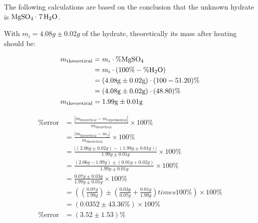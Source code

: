 \documentclass{article}
\begin{document}
The following calculations are based on the conclusion that the unknown hydrate is $\ce{MgSO4* 7H2O}$.

With $m_i = 4.08\si{g} \pm 0.02\si{g}$ of the hydrate, theoretically its mass after heating should be:

\begin{align*}
    m_{\text{theoretical}} & = m_i \cdot \%\ce{MgSO4}                            \\
                           & = m_i \cdot (100\% - \%\ce{H2O})                    \\
                           & = (4.08\si{g} \pm 0.02\si{g}) \cdot (100 - 51.20)\% \\
                           & = (4.08\si{g} \pm 0.02\si{g}) \cdot (48.80)\%       \\
    m_{\text{theoretical}} & = 1.99\si{g} \pm 0.01\si{g}
\end{align*}

\begin{align*}
    \%\text{error} & = \frac{|m_{\text{theoretical}} - m_{\text{experimental}}|}{m_{\text{theoretical}}} \times 100\%                                                                       \\[8pt]
                   & = \frac{|m_{\text{theoretical}} - m_f|}{m_{\text{theoretical}}} \times 100\%                                                                                           \\[8pt]
                   & = \frac{\left| (2.06\si{g} \pm 0.02\si{g}) - (1.99\si{g} \pm 0.01\si{g}) \right|}{1.99\si{g} \pm 0.01\si{g}} \times 100\%                                              \\[8pt]
                   & = \frac{(2.06\si{g} - 1.99\si{g}) \pm (0.01\si{g} + 0.02\si{g})}{1.99\si{g} \pm 0.01\si{g}} \times 100\%                                                               \\[8pt]
                   & = \frac{0.07\si{g} \pm 0.03\si{g}}{1.99\si{g} \pm 0.01\si{g}} \times 100\%                                                                                             \\[8pt]
                   & = \left( \left( \frac{0.07\si{g}}{1.99\si{g}} \right) \pm \left( \frac{0.03\si{g}}{0.07\si{g}} + \frac{0.01\si{g}}{1.99\si{g}} \right) times100\% \right) \times 100\% \\[8pt]
                   & = (0.0352 \pm 43.36\%) \times 100\%                                                                                                                                    \\
    \%\text{error} & = (3.52 \pm 1.53)\%
\end{align*}
\end{document}
